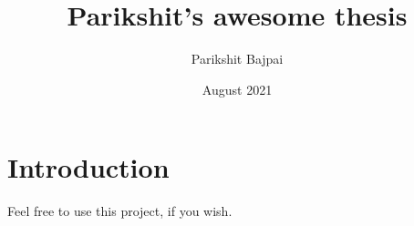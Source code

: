 \documentclass{article}
\title{Parikshit's awesome thesis}
\author{Parikshit Bajpai}
\date{August 2021}
\begin{document}
\maketitle

\section{Introduction}

Feel free to use this project, if you wish. 
\end{document}
